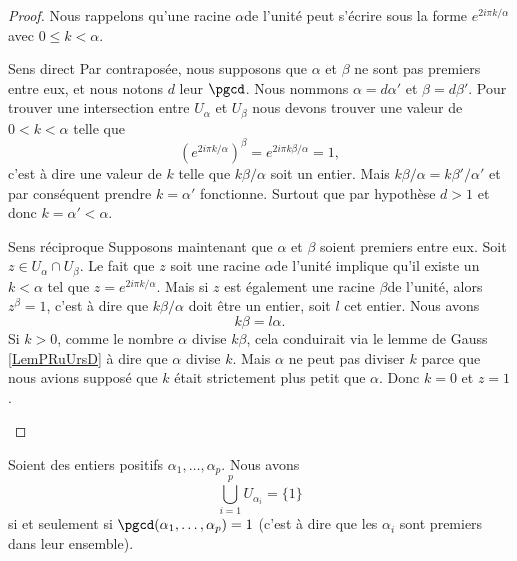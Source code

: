 \begin{proof}
    Nous rappelons qu'une racine \( \alpha\)\ieme de l'unité peut s'écrire sous la forme \(  e^{2i\pi k/\alpha}\) avec \( 0\leq k<\alpha\).
    \begin{subproof}
    \item[Sens direct]
        Par contraposée, nous supposons que \( \alpha\) et \( \beta\) ne sont pas premiers entre eux, et nous notons \( d\) leur \( \pgcd\). Nous nommons \( \alpha=d\alpha'\) et \( \beta=d\beta'\). Pour trouver une intersection entre \( U_{\alpha}\) et \( U_{\beta}\) nous devons trouver une valeur de \( 0<k<\alpha\) telle que
        \begin{equation}
            ( e^{2i\pi k/\alpha})^{\beta}= e^{2i\pi k\beta/\alpha}=1,
        \end{equation}
        c'est à dire une valeur de \( k\) telle que \( k\beta/\alpha\) soit un entier. Mais \( k\beta/\alpha=k\beta'/\alpha'\) et par conséquent prendre \( k=\alpha'\) fonctionne. Surtout que par hypothèse \( d>1\) et donc \( k=\alpha'<\alpha\).
    \item[Sens réciproque]
        Supposons maintenant que \( \alpha\) et \( \beta \) soient premiers entre eux. Soit \( z\in U_{\alpha}\cap U_{\beta}\). Le fait que \( z\) soit une racine \( \alpha\)\ieme de l'unité implique qu'il existe un \( k<\alpha\) tel que \( z= e^{2i\pi k/\alpha}\). Mais si \( z\) est également une racine \( \beta\)\ieme de l'unité, alors \( z^{\beta}=1\), c'est à dire que \( k\beta/\alpha\) doit être un entier, soit \( l\) cet entier. Nous avons
        \begin{equation}
            k\beta=l\alpha.
        \end{equation}
		Si \( k>0\), comme le nombre \( \alpha\) divise \( k\beta\), cela conduirait via le lemme de Gauss \ref{LemPRuUrsD} à dire que \( \alpha\) divise \( k\). Mais \( \alpha\) ne peut pas diviser \( k\) parce que nous avions supposé que \( k\) était strictement plus petit que \( \alpha\). Donc \( k = 0\) et \( z = 1\).
    \end{subproof}
\end{proof}

\begin{proposition}  \label{PropFDDHooEyYxBC}
    Soient des entiers positifs \( \alpha_1,\ldots, \alpha_p\). Nous avons
    \begin{equation}
        \bigcup_{i=1}^pU_{\alpha_i}=\{ 1 \}
    \end{equation}
    si et seulement si \( \pgcd(\alpha_1,\ldots, \alpha_p)=1\) (c'est à dire que les \( \alpha_i\) sont premiers dans leur ensemble).
\end{proposition}

